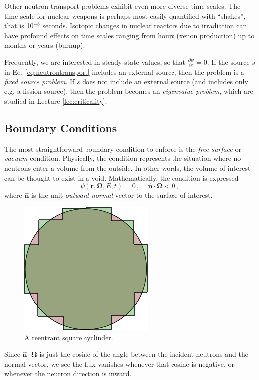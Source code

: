 Other neutron transport problems exhibit even more diverse time scales.  The time scale for nuclear weapons is perhaps most easily quantified with ``shakes'', that is 10$^{-8}$ seconds.  Isotopic changes in nuclear reactors due to irradiation can have profound effects on time scales ranging from hours (xenon production) up to months or years (burnup).

Frequently, we are interested in steady state values, so that $\frac{\partial \psi}{\partial t} = 0$.  If the source $s$ in Eq. \ref{eq:neutrontransport} includes an external source, then the problem is a \textit{fixed source problem}.  If $s$ does not include an external source (and includes only e.g. a fission source), then the problem becomes an \textit{eigenvalue problem}, which are studied in Lecture \ref{lec:criticality}.

\subsection*{Boundary Conditions}

The most straightforward boundary condition to enforce is the \textit{free surface} or \textit{vacuum} condition.  Physically, the condition represents the situation where no neutrons enter a volume from the outside.  In other words, the volume of interest can be thought to exist in a void.  Mathematically, the condition is expressed
\begin{equation}
 \psi(\mathbf{r},\mathbf{\Omega},E,t) = 0 \, , \, \, \, \,  \, \, \, \mathbf{\hat{n}} \cdot \mathbf{\Omega} < 0 \, ,
\end{equation}
where $\mathbf{\hat{n}}$ is the unit \textit{outward normal} vector to the surface of interest.  
\begin{figure}
    \begin{center}
    \includegraphics[keepaspectratio, width = 1.25 in]{squarecylinder}
    \end{center}
    \caption{A reentrant square cyclinder.}
    \label{fig:squarecylinder}
\end{figure}
Since $\mathbf{\hat{n}} \cdot \mathbf{\Omega}$ is just the cosine of the angle between the incident neutrons and the normal vector, we see the flux vanishes whenever that cosine is negative, or whenever the neutron direction is inward.

